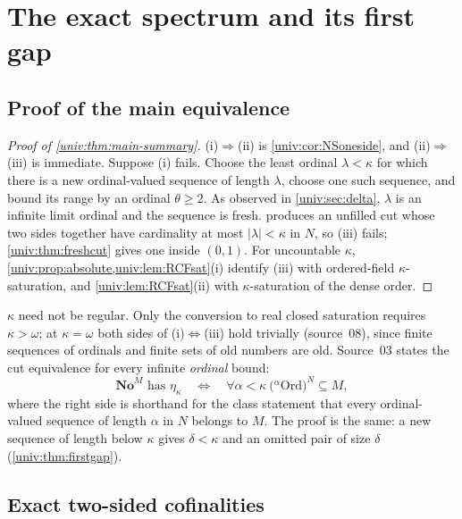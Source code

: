 \documentclass[11pt,letterpaper]{article}
\numberwithin{equation}{section}
\theoremstyle{definition}
\theoremstyle{remark}
\newcommand{\No}{\mathbf{No}}
\newcommand{\NoM}{\No^{M}}
\newcommand{\Ord}{\mathrm{Ord}}
\newcommand{\abs}[1]{\lvert#1\rvert}
\begin{document}
\section{The exact spectrum and its first gap}\label{univ:sec:spectrum}

\subsection{Proof of the main equivalence}

\begin{proof}[Proof of \cref{univ:thm:main-summary}]
(i)$\Rightarrow$(ii) is \cref{univ:cor:NSoneside}, and (ii)$\Rightarrow$(iii)
is immediate. Suppose (i) fails. Choose the least ordinal $\lambda<\kappa$ for
which there is a new ordinal-valued sequence of length $\lambda$, choose one
such sequence, and bound its range by an ordinal $\theta\geq2$. As observed in
\cref{univ:sec:delta}, $\lambda$ is an infinite limit ordinal and the
sequence is fresh.  produces an unfilled cut whose two
sides together have cardinality at most $\abs\lambda<\kappa$ in $N$, so (iii)
fails; \cref{univ:thm:freshcut} gives one inside $(0,1)$. For uncountable
$\kappa$, \cref{univ:prop:absolute,univ:lem:RCFsat}(i) identify (iii) with
ordered-field $\kappa$-saturation, and \cref{univ:lem:RCFsat}(ii) with
$\kappa$-saturation of the dense order.
\end{proof}

$\kappa$ need not be regular. Only the conversion to real closed saturation
requires $\kappa>\omega$; at $\kappa=\omega$ both sides of (i)$\Leftrightarrow$(iii)
hold trivially (source~08), since finite sequences of ordinals and finite sets
of old numbers are old. Source~03 states the cut equivalence for every
infinite \emph{ordinal} bound:
\begin{equation}\label{univ:eq:etaordinal}
 \NoM\text{ has }\eta_\kappa
 \quad\Longleftrightarrow\quad
 \forall\alpha<\kappa\ \bigl({}^{\alpha}\Ord\bigr)^N
 \subseteq M,
\end{equation}
where the right side is shorthand for the class statement that every
ordinal-valued sequence of length $\alpha$ in $N$ belongs to $M$. The proof is
the same: a new sequence of length below $\kappa$ gives $\delta<\kappa$ and an
omitted pair of size $\delta$ (\cref{univ:thm:firstgap}).

\subsection{Exact two-sided cofinalities}
\end{document}
